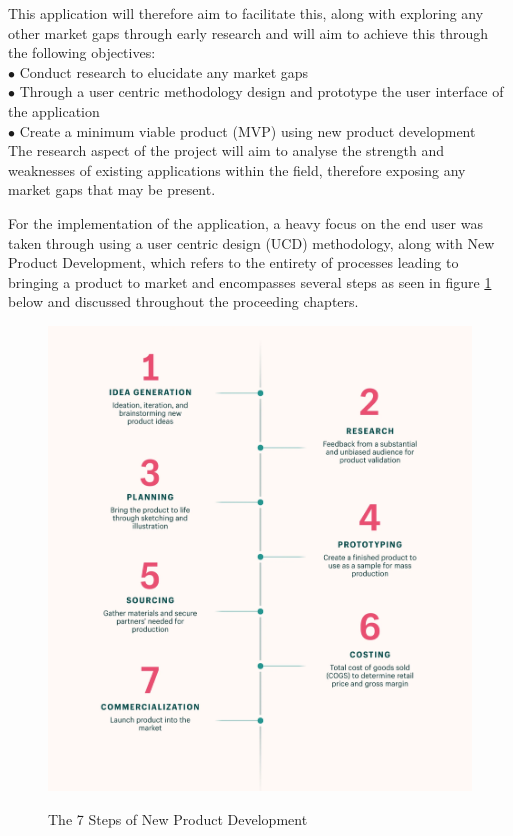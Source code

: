 \documentclass[12pt]{article}
\begin{document}
	This application will therefore aim to facilitate this, along with exploring any other market gaps through early research and will aim to achieve this through the following objectives:
	\\
	
	\noindent
	$\bullet$ Conduct research to elucidate any market gaps
	\\
	$\bullet$ Through a user centric methodology design and prototype the user interface of the application
	\\
	$\bullet$ Create a minimum viable product (MVP) using new product development
	\\
	
	The research aspect of the project will aim to analyse the strength and weaknesses of existing applications within the field, therefore exposing any market gaps that may be present. 
	
	For the implementation of the application, a heavy focus on the end user was taken through using a user centric design (UCD) methodology, along with New Product Development, which refers to the  entirety of processes leading to bringing a product to market and encompasses several steps as seen in figure \ref{fig:npd} below and discussed throughout the proceeding chapters.
	\newline
	
	\begin{figure}[H]
		\centering
		\includegraphics[scale=0.15]{images/npd.png}
		\caption{The 7 Steps of New Product Development}
		\label{fig:npd} \cite{shopify}
	\end{figure}
	
\end{document}
